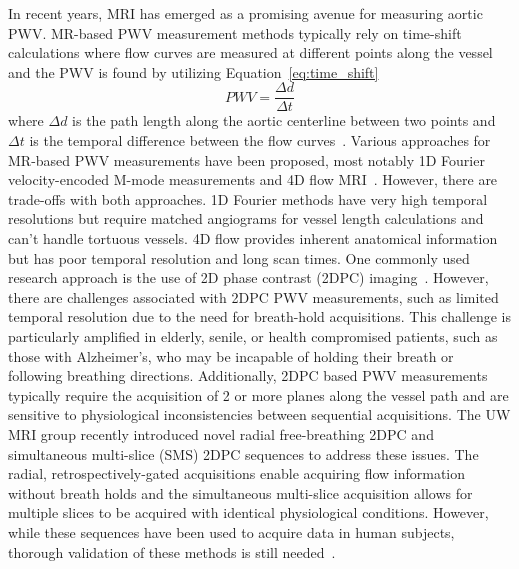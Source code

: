 In recent years, MRI has emerged as a promising avenue for measuring aortic PWV\@. MR-based PWV measurement methods typically rely on time-shift calculations where flow curves are measured at different points along the vessel and the PWV is found by utilizing Equation~\ref{eq:time_shift} 
\begin{equation}
    PWV=\frac{\Delta d}{\Delta t}
    \label{eq:time_shift}
\end{equation} 
where $\Delta d$ is the path length along the aortic centerline between two points and $\Delta t$ is the temporal difference between the flow curves~\cite{wentlandReviewMRIbasedMeasurements2014}. Various approaches for MR-based PWV measurements have been proposed, most notably 1D Fourier velocity-encoded M-mode measurements and 4D flow MRI~\cite{tavianiAccuracyRepeatabilityFourier2010,wentlandAorticPulseWave2013}\@. However, there are trade-offs with both approaches. 1D Fourier methods have very high temporal resolutions but require matched angiograms for vessel length calculations and can't handle tortuous vessels. 4D flow provides inherent anatomical information but has poor temporal resolution and long scan times. One commonly used research approach is the use of 2D phase contrast (2DPC) imaging~\cite{wentlandCineFlowMeasurements2006,tavianiAccuracyRepeatabilityFourier2010}. However, there are challenges associated with 2DPC PWV measurements, such as limited temporal resolution due to the need for breath-hold acquisitions. This challenge is particularly amplified in elderly, senile, or health compromised patients, such as those with Alzheimer's, who may be incapable of holding their breath or following breathing directions\cite{dorniakRequiredTemporalResolution2016}. Additionally, 2DPC based PWV measurements typically require the acquisition of 2 or more planes along the vessel path and are sensitive to physiological inconsistencies between sequential acquisitions. The UW MRI group recently introduced novel radial free-breathing 2DPC and simultaneous multi-slice (SMS) 2DPC sequences to address these issues\cite{robertsAdvancingFunctionalAssessment2023}. The radial, retrospectively-gated acquisitions enable acquiring flow information without breath holds and the simultaneous multi-slice acquisition allows for multiple slices to be acquired with identical physiological conditions. However, while these sequences have been used to acquire data in human subjects, thorough validation of these methods is still needed~\cite{roberts2DPhaseContrast,narenEffectTemporalResolution}.

